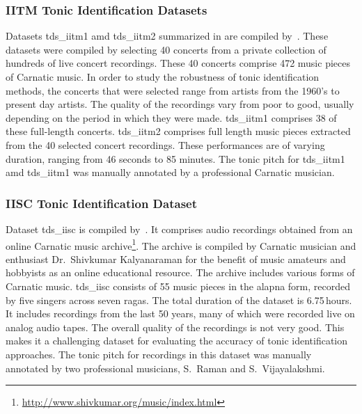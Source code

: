 {\subsubsection{IITM Tonic Identification Datasets}
\label{sec:corpus_iitm_tonic_datasets}

Datasets \acrshort{tds_iitm1} amd \acrshort{tds_iitm2} summarized in  are compiled by~\cite{bellur2012knowledge}. These datasets were compiled by selecting 40 concerts from a private collection of hundreds of live concert recordings. These 40 concerts comprise 472 music pieces of Carnatic music. In order to study the robustness of tonic identification methods, the concerts that were selected range from artists from the 1960's to present day artists. The quality of the recordings vary from poor to good, usually depending on the period in which they were made. \acrshort{tds_iitm1} comprises 38 of these full-length concerts. \acrshort{tds_iitm2} comprises full length music pieces extracted from the 40 selected concert recordings. These performances are of varying duration, ranging from 46 seconds to 85 minutes. The tonic pitch for \acrshort{tds_iitm1} amd \acrshort{tds_iitm1} was manually annotated by a professional Carnatic musician.


\subsubsection{IISC Tonic Identification Dataset}
\label{sec:corpus_iisc_tonic_dataset}

Dataset \acrshort{tds_iisc} is compiled by~\cite{ranjani2011carnatic}. It comprises audio recordings obtained from an online Carnatic music archive\footnote{\url{http://www.shivkumar.org/music/index.html}}. The archive is compiled by Carnatic musician and enthusiast Dr.~Shivkumar Kalyanaraman for the benefit of music amateurs and hobbyists as an online educational resource. The archive includes various forms of Carnatic music. \acrshort{tds_iisc} consists of 55 music pieces in the \gls{alapna} form, recorded by five singers across seven \glspl{raga}. The total duration of the dataset is 6.75\,hours. It includes recordings from the last 50 years, many of which were recorded live on analog audio tapes. The overall quality of the recordings is not very good. This makes it a challenging dataset for evaluating the accuracy of tonic identification approaches. The tonic pitch for recordings in this dataset was manually annotated by two professional musicians, S.~Raman and S.~Vijayalakshmi.


}
